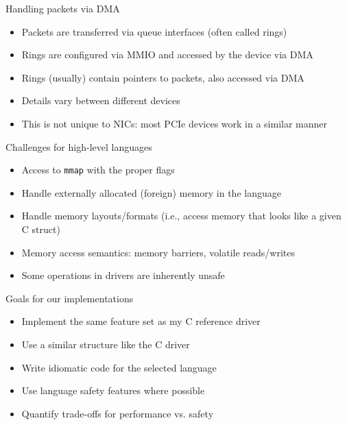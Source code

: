 \documentclass[NET,english,aspectratio=169,notitleframe]{tumbeamer}
\begin{document}
\begin{frame}{Handling packets via DMA}
\begin{itemize}
\item Packets are transferred via queue interfaces (often called rings)
\item Rings are configured via MMIO and accessed by the device via DMA
\item Rings (usually) contain pointers to packets, also accessed via DMA
\pause
\vspace{1em}
\item Details vary between different devices
\item This is not unique to NICs: most PCIe devices work in a similar manner
\end{itemize}
\end{frame}


\begin{frame}{Challenges for high-level languages}
\begin{itemize}
\item Access to \texttt{mmap} with the proper flags
\item Handle externally allocated (foreign) memory in the language
\item Handle memory layouts/formats (i.e., access memory that looks like a given C struct)
\item Memory access semantics: memory barriers, volatile reads/writes
\item Some operations in drivers are inherently unsafe
\end{itemize}
\end{frame}


\begin{frame}{Goals for our implementations}
\begin{itemize}
\item Implement the same feature set as my C reference driver
\item Use a similar structure like the C driver
\item Write idiomatic code for the selected language
\item Use language safety features where possible
\item Quantify trade-offs for performance vs. safety
\end{itemize}
\end{frame}
\end{document}
